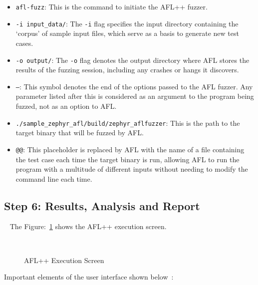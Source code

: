\begin{itemize}
    \item \texttt{afl-fuzz}: This is the command to initiate the AFL++ fuzzer.
    \item \texttt{-i input\_data/}: The \texttt{-i} flag specifies the
    input directory containing the `corpus' of sample input files,
    which serve as a basis to generate new test cases.
    \item \texttt{-o output/}: The \texttt{-o} flag denotes the output
    directory where AFL stores the results of the fuzzing session,
    including any crashes or hangs it discovers.
    \item \texttt{--}: This symbol denotes the end of the options passed
    to the AFL fuzzer. Any parameter listed after this is considered as
    an argument to the program being fuzzed, not as an option to AFL.
    \item \texttt{./sample\_zephyr\_afl/build/zephyr\_aflfuzzer}: This is the
    path to the target binary that will be fuzzed by AFL.
    \item \texttt{@@}: This placeholder is replaced by AFL with the name of a
    file containing the test case each time the target binary is run,
    allowing AFL to run the program with a multitude of different inputs
    without needing to modify the command line each time.
\end{itemize}
\subsection*{Step 6: Results, Analysis and Report}~\label{subsec:execution afl-fuzz}
The Figure:~\ref{fig:afl_execute_1} shows the AFL++ execution screen.
\begin{figure}[H]
        \caption{AFL++ Execution Screen}~\label{fig:afl_execute_1}
\end{figure}

Important elements of the user interface shown below~\cite{257204}:

